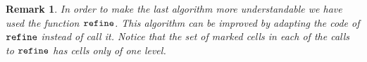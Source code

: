 \documentclass[a4paper]{siamltex1213}
\newtheorem{remark}[theorem]{Remark}
\newcommand{\note}[1]{{\noindent\centerline{\fbox{\parbox{.9\textwidth}{\textbf{
#1}}}}}}
\DeclareMathOperator\mesh{\texttt{MESH}}
\DeclareMathOperator\basis{\texttt{SPACE}}
\DeclareMathOperator\marked{\tt MARKED}
\newcommand\BB{\mathcal B}
\newcommand\QQ{\mathcal Q}
\begin{document}













\begin{remark}
 In order to make the last algorithm more understandable we have used the function $\verb+refine+$. This algorithm can be improved by adapting the code of $\verb+refine+$ instead of call it. Notice that the set of marked cells in each of the calls to $\verb+refine+$ has cells only of one level. 
\end{remark}


\end{document}

